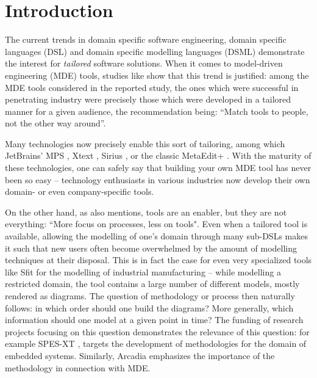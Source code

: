 \section{Introduction}
\label{sec:intro}
\vspace{-.3cm}
The current trends in domain specific software engineering, domain specific
languages (DSL) and domain specific modelling languages (DSML) demonstrate the
interest for \emph{tailored} software solutions.
When it comes to model-driven engineering (MDE) tools, studies like \cite{DBLP:conf/models/WhittleHRBH13} 
show that this trend is justified: among the MDE tools considered
in the reported study, the ones which were successful in penetrating industry
were precisely those which were developed in a tailored manner for a given
audience, the recommendation being: ``Match tools to people, not the other way
around''.

Many technologies now precisely enable this sort of tailoring, among which 
JetBrains' MPS \cite{DBLP:conf/pppj/PechSV13},
Xtext \cite{DBLP:conf/oopsla/EysholdtB10},
Sirius \cite{DBLP:conf/asplos/HauswaldLZLRKDM15}, or the classic MetaEdit+ \cite{DBLP:conf/sle/Tolvanen16}.
With the maturity of these technologies, one can safely say that building your own MDE tool
has never been so easy -- technology enthusiasts in various industries now
develop their own domain- or even company-specific tools.

On the other hand, as \cite{DBLP:conf/models/WhittleHRBH13} also mentions, tools
are an enabler, but they are not everything: ``More focus on processes, less on
tools".
Even when a tailored tool is available, allowing the modelling of one's domain
through many sub-DSLs makes it such that new users often become overwhelmed by
the amount of modelling techniques at their disposal. This is in fact the case
for even very specialized tools like Sfit \cite{DBLP:conf/vamos/BayhaLAMI16} for
the modelling of industrial manufacturing -- while modelling a restricted
domain, the tool contains a large number of different models, mostly rendered as
diagrams. The question of methodology or process then naturally follows: in
which order should one build the diagrams? More generally, which information
should one model at a given point in time? The funding of research projects
focusing on this question demonstrates the relevance of this question: for
example SPES-XT \cite{DBLP:books/sp/spes2016}, targets the development of
methodologies for the domain of embedded systems.
Similarly, Arcadia \cite{DBLP:conf/syscon/BonnetVEN16} emphasizes the importance
of the methodology in connection with MDE.

